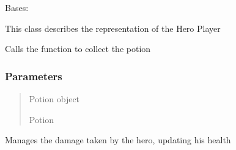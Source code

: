 \documentclass[letterpaper,10pt,english]{sphinxmanual}
\begin{document}
\begin{fulllineitems}
\label{\detokenize{api_reference/dungeon_gui/Player:Player.Player}}
\pysigstartsignatures
{}
\pysigstopsignatures
\sphinxAtStartPar
Bases: 

\sphinxAtStartPar
This class describes the representation of the Hero Player

\begin{fulllineitems}
\label{\detokenize{api_reference/dungeon_gui/Player:Player.Player.collect_potion}}
\pysigstartsignatures
{}
\pysigstopsignatures
\sphinxAtStartPar
Calls the function to collect the potion


\subsubsection{Parameters}
\label{\detokenize{api_reference/dungeon_gui/Player:parameters}}\begin{quote}\begin{description}
\sphinxAtStartPar
Potion object

\sphinxAtStartPar
Potion

\end{description}\end{quote}

\end{fulllineitems}


\begin{fulllineitems}
\label{\detokenize{api_reference/dungeon_gui/Player:Player.Player.get_damage}}
\pysigstartsignatures
{}
\pysigstopsignatures
\sphinxAtStartPar
Manages the damage taken by the hero, updating his health



\end{fulllineitems}
\end{fulllineitems}
\end{document}
